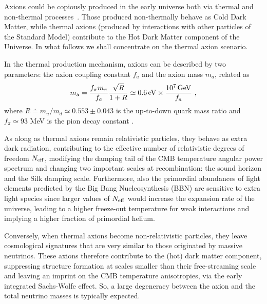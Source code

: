 \documentclass[fleqn,usenatbib,letters]{mnras}
\begin{document}
Axions could be copiously produced in the early universe both via thermal and non-thermal processes~\citep{Abbott:1982af,Dine:1982ah,Preskill:1982cy,Linde:1985yf,Seckel:1985tj,Lyth:1989pb,Linde:1990yj,Vilenkin:2000jqa,Kibble:1976sj,Kibble:1982dd,Vilenkin:1981kz,Davis:1986xc,Vilenkin:1982ks, Sikivie:1982qv,Vilenkin:1982ks,Huang:1985tt, Melchiorri:2007cd,Hannestad:2007dd,Hannestad:2008js,Hannestad:2010yi,Archidiacono:2013cha,Giusarma:2014zza,DiValentino:2015zta,DiValentino:2015wba,Archidiacono:2015mda,Hannestad:2005df}. Those produced non-thermally behave as Cold Dark Matter, while thermal axions (produced by interactions with other particles of the Standard Model) contribute to the Hot Dark Matter component of the Universe. In what follows we shall concentrate on the thermal axion scenario.

In the thermal production mechanism, axions can be described by two parameters: the axion coupling constant $f_a$ and the axion mass $m_a$, related as
\begin{equation}
m_{\rm a}=\frac{f_{\pi} m_{\pi}}{f_{a}} \frac{\sqrt{R}}{1+R}\simeq 0.6\, \mathrm{eV} \times \frac{10^{7}
	\,\mathrm{GeV}}{f_{a}}~,
\end{equation}
where $R\doteq m_u/m_d\simeq0.553 \pm 0.043 $ is the up-to-down quark mass ratio and $f_{\pi}\simeq 93$ MeV is the pion decay constant \citep{Zyla:2020zbs}. 

As along as thermal axions remain relativistic particles, they behave as extra dark radiation, contributing to the effective number of relativistic degrees of freedom $N_{\rm eff}$, modifying the damping tail of the CMB temperature angular power spectrum and changing two important scales at recombination: the sound horizon and the Silk damping scale. Furthermore, also the primordial abundances of light elements predicted by the Big Bang Nucleosynthesis (BBN) are sensitive to extra light species since larger values of $N_{\rm eff}$ would increase the expansion rate of the universe, leading to a higher freeze-out temperature for weak interactions and implying a higher fraction of primordial helium. 

Conversely, when thermal axions become non-relativistic particles, they leave cosmological signatures that are very similar to those originated by massive neutrinos. These axions therefore  contribute to the (hot) dark matter component, suppressing structure formation at scales smaller than their free-streaming scale and leaving an imprint on the CMB temperature anisotropies, via the early integrated Sachs-Wolfe effect. So, a large degeneracy between the axion and the total neutrino masses is typically expected. 
\end{document}
